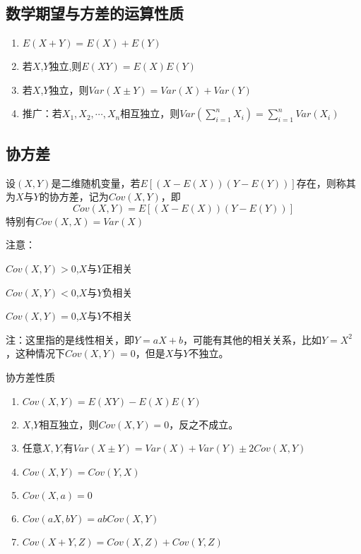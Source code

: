     \subsection{数学期望与方差的运算性质}
    \begin{enumerate}
        \item $E(X + Y) = E(X) + E(Y)$
        \item 若$X$,$Y$独立,则$E(XY) = E(X)E(Y)$
        \item 若$X$,$Y$独立，则$Var(X \pm Y) = Var(X) + Var(Y)$
        \item 推广：若$X_1,X_2,\cdots,X_n$相互独立，则$Var(\sum\limits_{i = 1}^n {{X_i}} ) = \sum\limits_{i = 1}^n {Var({X_i})} $
    \end{enumerate}

    \subsection{协方差}
    \begin{definition}
        设$(X,Y)$是二维随机变量，若$E[(X - E(X))(Y - E(Y))]$存在，则称其为$X$与$Y$的协方差，记为$Cov(X,Y)$，即$$Cov(X,Y) = E[(X - E(X))(Y - E(Y))]$$特别有$Cov(X,X) = Var(X)$
    \end{definition}

    注意：

$Cov(X,Y)>0$,$X$与$Y$正相关

$Cov(X,Y)<0$,$X$与$Y$负相关

$Cov(X,Y)=0$,$X$与$Y$不相关


    注：这里指的是线性相关，即$Y=aX+b$，可能有其他的相关关系，比如$Y=X^2$，这种情况下$Cov(X,Y)=0$，但是$X$与$Y$不独立。
    \begin{property} 协方差性质
        \begin{enumerate}
            \item $Cov(X,Y) = E(XY) - E(X)E(Y)$
            \item $X$,$Y$相互独立，则$Cov(X,Y) = 0$，反之不成立。
            \item 任意$X,Y$,有$Var(X \pm Y)=Var(X)+Var(Y) \pm 2Cov(X,Y) $
            \item $Cov(X,Y) = Cov(Y,X)$
            \item $Cov(X,a)=0$
            \item $Cov(aX,bY)=abCov(X,Y)$
            \item $Cov(X+Y,Z)=Cov(X,Z)+Cov(Y,Z)$
        \end{enumerate}

    \end{property}

